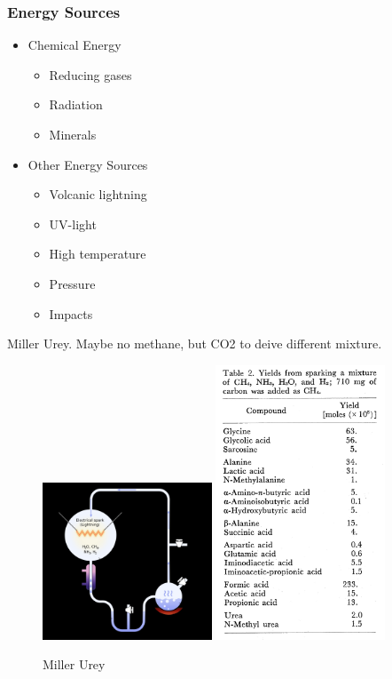 \documentclass[]{article}
\begin{document}
\subsubsection{Energy Sources}
\begin{itemize}
	\item Chemical Energy
	\begin{itemize}
		\item Reducing gases
		\item Radiation
		\item Minerals
	\end{itemize}
	\item Other Energy Sources
	\begin{itemize}
		\item Volcanic lightning
		\item UV-light
		\item High temperature
		\item Pressure
		\item Impacts
	\end{itemize}
\end{itemize}
Miller Urey. Maybe no methane, but CO2 to deive different mixture.

\begin{figure}[h!]
	\caption{Miller Urey \cite{miller1959organic}}
	\includegraphics[width=0.45\textwidth]{MillerUrey1}
	\includegraphics[width=0.45\textwidth]{MillerUrey2}
\end{figure}
\end{document}
